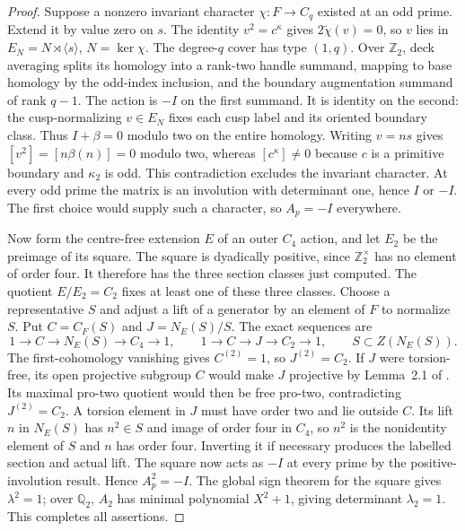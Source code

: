 \begin{proof}
Suppose a nonzero invariant character
$\chi:F\to C_q$ existed at an odd prime.  Extend it
by value zero on $s$.  The identity $v^2=c^\kappa$
gives $2\widetilde\chi(v)=0$, so $v$ lies in
$E_N=N\rtimes\langle s\rangle$, $N=\ker\chi$.
The degree-$q$ cover has type $(1,q)$.  Over
$\mathbb Z_2$, deck averaging splits its homology
into a rank-two handle summand, mapping to base
homology by the odd-index inclusion, and the boundary
augmentation summand of rank $q-1$.  The action is
$-I$ on the first summand.  It is identity on the
second: the cusp-normalizing $v\in E_N$ fixes each
cusp label and its oriented boundary class.  Thus
$I+\beta=0$ modulo two on the entire homology.
Writing $v=ns$ gives $[v^2]=[n\beta(n)]=0$ modulo
two, whereas $[c^\kappa]\ne0$ because $c$ is a
primitive boundary and $\kappa_2$ is odd.  This
contradiction excludes the invariant character.
At every odd prime the matrix is an involution with
determinant one, hence $I$ or $-I$.  The first choice
would supply such a character, so $A_p=-I$ everywhere.

Now form the centre-free extension $E$ of an outer
$C_4$ action, and let $E_2$ be the preimage of its
square.  The square is dyadically positive, since
$\mathbb Z_2^\times$ has no element of order four.
It therefore has the three section classes just
computed.  The quotient $E/E_2=C_2$ fixes at least
one of these three classes.  Choose a representative
$S$ and adjust a lift of a generator by an element
of $F$ to normalize $S$.  Put $C=C_F(S)$ and
$J=N_E(S)/S$.  The exact sequences are
\[
 1\to C\to N_E(S)\to C_4\to1,
 \qquad 1\to C\to J\to C_2\to1,
 \qquad S\subset Z(N_E(S)).
                                                               \tag{C.19.2}
\]
The first-cohomology vanishing gives $C^{(2)}=1$,
so $J^{(2)}=C_2$.  If $J$ were torsion-free, its
open projective subgroup $C$ would make $J$
projective by Lemma~2.1 of \cite{CEJarden1982}.
Its maximal pro-two quotient would then be free
pro-two, contradicting $J^{(2)}=C_2$.
A torsion element in $J$ must have order two and
lie outside $C$.  Its lift $n$ in $N_E(S)$ has
$n^2\in S$ and image of order four in $C_4$,
so $n^2$ is the nonidentity element of $S$ and
$n$ has order four.  Inverting it if necessary
produces the labelled section and actual lift.
The square now acts as $-I$ at every prime by the
positive-involution result.  Hence $A_p^2=-I$.
The global sign theorem for the square gives
$\lambda^2=1$; over $\mathbb Q_2$, $A_2$ has
minimal polynomial $X^2+1$, giving determinant
$\lambda_2=1$.  This completes all assertions.
\end{proof}
